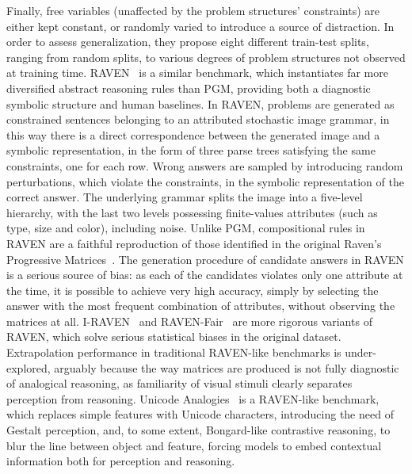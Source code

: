 Finally, free variables (unaffected by the problem structures' constraints) are either kept constant, or randomly varied to introduce a source of distraction.
In order to assess generalization, they propose eight different train-test splits, ranging from random splits, to various degrees of problem structures not observed at training time.
%
RAVEN~\cite{zhang2019raven} is a similar benchmark, which instantiates far more diversified abstract reasoning rules than PGM, providing both a diagnostic symbolic structure %
and human baselines.
In RAVEN, problems are generated as constrained sentences belonging to an attributed stochastic image grammar, in this way there is a direct correspondence between the generated image and a symbolic representation, in the form of three parse trees satisfying the same constraints, one for each row. 
Wrong answers are sampled by introducing random perturbations, which violate the constraints, in the symbolic representation of the correct answer.
The underlying grammar splits the image into a five-level hierarchy, with the last two levels possessing finite-values attributes (such as type, size and color), including noise.
Unlike PGM, compositional rules in RAVEN are a faithful reproduction of those identified in the original Raven's Progressive Matrices~\cite{carpenter1990one}.
The generation procedure of candidate answers in RAVEN is a serious source of bias: as each of the candidates violates only one attribute at the time, it is possible to achieve very high accuracy, simply by selecting the answer with the most frequent combination of attributes, without observing the matrices at all. 
I-RAVEN~\cite{hu2021stratified} and RAVEN-Fair~\cite{benny2021scale} are more rigorous variants of RAVEN, which solve serious statistical biases in the original dataset.
%
Extrapolation performance in traditional RAVEN-like benchmarks is under-explored, arguably because the way matrices are produced is not fully diagnostic of analogical reasoning, as familiarity of visual stimuli clearly separates perception from reasoning.
Unicode Analogies~\cite{spratley2023unicode} is a RAVEN-like benchmark, which replaces simple features with Unicode characters, introducing the need of Gestalt perception, and, to some extent, Bongard-like contrastive reasoning, to blur the line between object and feature, forcing models to embed contextual information both for perception and reasoning.
